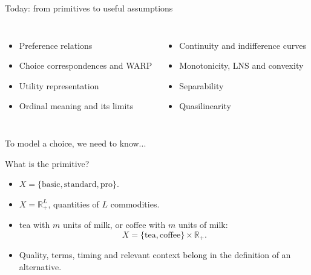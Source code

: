 \documentclass[handout,aspectratio=169,10pt]{beamer}
\begin{document}
\begin{frame}[label=today]{Today: from primitives to useful assumptions}
\begin{columns}[T]
\begin{itemize}[<+->]\item Preference relations
\item Choice correspondences and WARP
\item Utility representation
\item Ordinal meaning and its limits\end{itemize}
\begin{itemize}[<+->]\item Continuity and indifference curves
\item Monotonicity, LNS and convexity
\item Separability
\item Quasilinearity\end{itemize}
\end{columns}
\end{frame}

\begin{frame}[label=wants-and-can]{To model a choice, we need to know...}
\begin{center}
\vspace{8mm}
\vspace{8mm}
\end{center}
\end{frame}

\begin{frame}[label=choice-set]{What is the primitive?}
\begin{itemize}[<+->]
\item {} $X=\{\text{basic},\text{standard},\text{pro}\}$.
\item {} $X=\mathbb R_+^L$, quantities of $L$ commodities.
\item {} tea with $m$ units of milk, or coffee with $m$ units of milk:
\[
X=\{\text{tea},\text{coffee}\}\times\mathbb R_+.
\]
\item Quality, terms, timing and relevant context belong in the definition of an alternative.
\end{itemize}
\end{frame}
\end{document}
